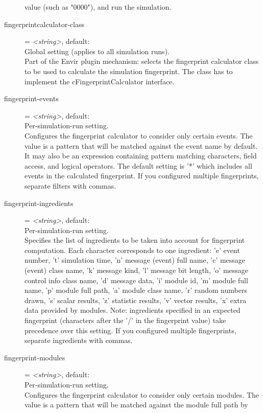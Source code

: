 \begin{description}
    value (such as "0000"), and run the simulation.
\item[fingerprintcalculator-class] = \textit{<string>}, default: \\
    Global setting (applies to all simulation runs).\\
    Part of the Envir plugin mechanism: selects the fingerprint calculator class to be
    used to calculate the simulation fingerprint. The class has to implement
    the cFingerprintCalculator interface.
\item[fingerprint-events] = \textit{<string>}, default: \ttt{*}\\
    Per-simulation-run setting.\\
    Configures the fingerprint calculator to consider only certain events. The
    value is a pattern that will be matched against the event name by default.
    It may also be an expression containing pattern matching characters, field
    access, and logical operators. The default setting is '*' which includes
    all events in the calculated fingerprint. If you configured multiple
    fingerprints, separate filters with commas.
\item[fingerprint-ingredients] = \textit{<string>}, default: \\
    Per-simulation-run setting.\\
    Specifies the list of ingredients to be taken into account for fingerprint
    computation. Each character corresponds to one ingredient: 'e' event
    number, 't' simulation time, 'n' message (event) full name, 'c' message
    (event) class name, 'k' message kind, 'l' message bit length, 'o' message
    control info class name, 'd' message data, 'i' module id, 'm' module full
    name, 'p' module full path, 'a' module class name, 'r' random numbers
    drawn, 's' scalar results, 'z' statistic results, 'v' vector results, 'x'
    extra data provided by modules. Note: ingredients specified in an expected
    fingerprint (characters after the '/' in the fingerprint value) take
    precedence over this setting. If you configured multiple fingerprints,
    separate ingredients with commas.
\item[fingerprint-modules] = \textit{<string>}, default: \ttt{*}\\
    Per-simulation-run setting.\\
    Configures the fingerprint calculator to consider only certain modules. The
    value is a pattern that will be matched against the module full path by

\end{description}
